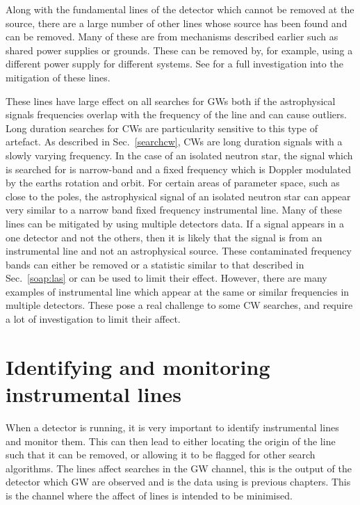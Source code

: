 Along with the fundamental lines of the detector which cannot be removed at the source, there are a large number of other lines whose source has been found and can be removed. 
Many of these are from mechanisms described earlier such as shared power supplies or grounds. These can be removed by, for example, using a different power supply for different systems. See \citep{covas2018IdentificationMitigation} for a full investigation into the mitigation of these lines.

%

These lines have large effect on all searches for \glspl{GW} both if the astrophysical signals frequencies overlap with the frequency of the line and can cause outliers. 
Long duration searches for \glspl{CW} are particularity sensitive to this type of artefact.
As described in Sec.~\ref{searchcw}, \glspl{CW} are long duration signals with a slowly varying frequency.
In the case of an isolated neutron star, the signal which is searched for is narrow-band and a fixed frequency which is Doppler modulated by the earths rotation and orbit.
For certain areas of parameter space, such as close to the poles, the astrophysical signal of an isolated neutron star can appear very similar to a narrow band fixed frequency instrumental line. 
Many of these lines can be mitigated by using multiple detectors data. If a signal appears in a one detector and not the others, then it is likely that the signal is from an instrumental line and not an astrophysical source. 
These contaminated frequency bands can either be removed or a statistic similar to that described in Sec.~\ref{soap:las} or \citep{keitel2014SearchContinuous} can be used to limit their effect.
However, there are many examples of instrumental line which appear at the same or similar frequencies in multiple detectors.
These pose a real challenge to some \gls{CW} searches, and require a lot of investigation to limit their affect.

\section{\label{detchar:monitor}Identifying and monitoring instrumental lines}
%

When a detector is running, it is very important to identify instrumental lines and monitor them.
This can then lead to either locating the origin of the line such that it can be removed, or allowing it to be flagged for other search algorithms.
The lines affect searches in the \gls{GW} channel, this is the output of the detector which \gls{GW} are observed and is the data using is previous chapters.
This is the channel where the affect of lines is intended to be minimised.

